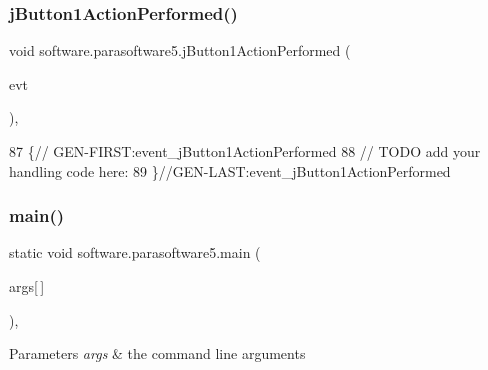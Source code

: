 \subsubsection{\texorpdfstring{j\+Button1\+Action\+Performed()}{jButton1ActionPerformed()}}
{\footnotesize\ttfamily void software.\+parasoftware5.\+j\+Button1\+Action\+Performed (\begin{DoxyParamCaption}\item[{java.\+awt.\+event.\+Action\+Event}]{evt }\end{DoxyParamCaption})\hspace{0.3cm}{\ttfamily [inline]}, {\ttfamily [private]}}


\begin{DoxyCode}
87                                                                          \{\textcolor{comment}{//
      GEN-FIRST:event\_jButton1ActionPerformed}
88         \textcolor{comment}{// TODO add your handling code here:}
89     \}\textcolor{comment}{//GEN-LAST:event\_jButton1ActionPerformed}
\end{DoxyCode}
\mbox{\label{classsoftware_1_1parasoftware5_afd6fb9e87cb1b0e85c9f3930e8df4fed}} 
\subsubsection{\texorpdfstring{main()}{main()}}
{\footnotesize\ttfamily static void software.\+parasoftware5.\+main (\begin{DoxyParamCaption}\item[{String}]{args\mbox{[}$\,$\mbox{]} }\end{DoxyParamCaption})\hspace{0.3cm}{\ttfamily [inline]}, {\ttfamily [static]}}


\begin{DoxyParams}{Parameters}
{\em args} & the command line arguments \\
\hline
\end{DoxyParams}

